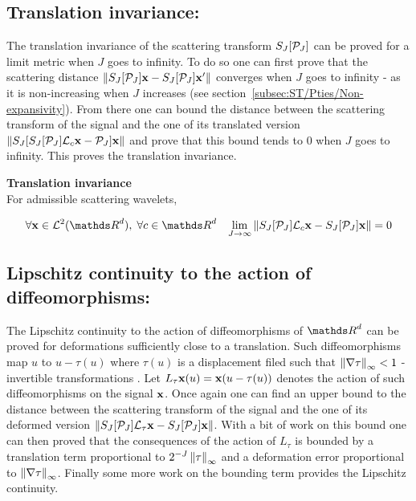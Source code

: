 \documentclass[a4paper,11pt]{report}
\begin{document}
		\subsection{Translation invariance:}
			\label{subsec:ST/Pties/Translation}
			
			The translation invariance of the scattering transform $S_{J}[\mathcal{P}_{J}]$ can be proved for a limit metric when $J$ goes to infinity. To do so one can first prove that the scattering distance $\left\lVert S_{J}[\mathcal{P}_{J}]{\bf x} - S_{J}[\mathcal{P}_{J}]{\bf x}' \right\rVert$ converges when $J$ goes to infinity - as it is non-increasing when $J$ increases (see section~\ref{subsec:ST/Pties/Non-expansivity}). From there one can bound the distance between the scattering transform of the signal and the one of its translated version $\left\lVert S_{J}[ S_{J}[\mathcal{P}_{J}]\mathcal{L}_{c}{\bf x} - \mathcal{P}_{J}]{\bf x} \right\rVert$ and prove that this bound tends to $0$ when $J$ goes to infinity. This proves the translation invariance.
			
			\begin{thm} \textbf{Translation invariance}\\
				For admissible scattering wavelets,
				
				\begin{equation}
					\forall \bfx \in \mcalL^{2}(\dsR^{d}), \; \forall c \in \dsR^{d} \;\;\; \lim_{J \rightarrow \infty} \norm{S_{J}[\mcalP_{J}]\mcalL_{c}\bfx - S_{J}[\mcalP_{J}]\bfx} = 0
					\label{eq:Tranlation invariance}
				\end{equation}
				\label{thm:Translation invariance}
			  
			\end{thm}

		\subsection{Lipschitz continuity to the action of diffeomorphisms:}
			\label{subsec:ST/Pties/Lipschitz continuity}
			
			The Lipschitz continuity to the action of diffeomorphisms of $\dsR^{d}$ can be proved for deformations sufficiently close to a translation. Such diffeomorphisms map $u$ to $u-\tau(u)$ where $\tau(u)$ is a displacement filed such that $\left\lVert \nabla \tau \right\rVert_{\infty} < 1$ -\ie invertible transformations \cite{bruna2013invariant}. Let $L_{\tau}{\bf x}(u)={\bf x}(u-\tau(u))$ denotes the action of such diffeomorphisms on the signal ${\bf x}$. Once again one can find an upper bound to the distance between the scattering transform of the signal and the one of its deformed version $\left\lVert S_{J}[\mathcal{P}_{J}]\mathcal{L}_{\tau}{\bf x} - S_{J}[\mathcal{P}_{J}]{\bf x} \right\rVert$. With a bit of work on this bound one can then proved that the consequences of the action of $L_{\tau}$ is bounded by a translation term proportional to $2^{-J} \left\lVert \tau \right\rVert_{\infty}$ and a deformation error proportional to $\left\lVert \nabla \tau \right\rVert_{\infty}$. Finally some more work on the bounding term provides the Lipschitz continuity.
			
\end{document}
